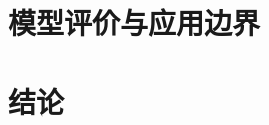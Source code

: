 \documentclass[withoutpreface]{cumcmthesis}
\begin{document}
\section{模型评价与应用边界}

\section{结论}


\nocite{*}

\end{document}
